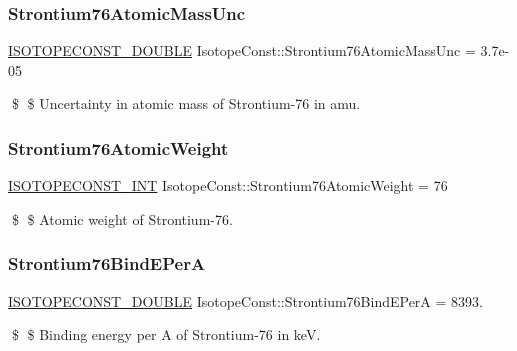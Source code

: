 \subsubsection{\texorpdfstring{Strontium76\+Atomic\+Mass\+Unc}{Strontium76AtomicMassUnc}}
{\footnotesize\ttfamily \mbox{\hyperlink{group___isotope_const-_macros_ga8f45a7272ce02c0b4c65c44636ed719a}{I\+S\+O\+T\+O\+P\+E\+C\+O\+N\+S\+T\+\_\+\+D\+O\+U\+B\+LE}} Isotope\+Const\+::\+Strontium76\+Atomic\+Mass\+Unc = 3.\+7e-\/05}

\$ \$ Uncertainty in atomic mass of Strontium-\/76 in amu. \mbox{\label{group___isotope_const-_strontium-_sr76_ga64325edd5c81eb6ec8439e5f89a200fe}} 
\subsubsection{\texorpdfstring{Strontium76\+Atomic\+Weight}{Strontium76AtomicWeight}}
{\footnotesize\ttfamily \mbox{\hyperlink{group___isotope_const-_macros_ga5f18360b3e99483a35c32d789e62621c}{I\+S\+O\+T\+O\+P\+E\+C\+O\+N\+S\+T\+\_\+\+I\+NT}} Isotope\+Const\+::\+Strontium76\+Atomic\+Weight = 76}

\$ \$ Atomic weight of Strontium-\/76. \mbox{\label{group___isotope_const-_strontium-_sr76_ga3fd026008b42d098c7028dc0bd17117d}} 
\subsubsection{\texorpdfstring{Strontium76\+Bind\+E\+PerA}{Strontium76BindEPerA}}
{\footnotesize\ttfamily \mbox{\hyperlink{group___isotope_const-_macros_ga8f45a7272ce02c0b4c65c44636ed719a}{I\+S\+O\+T\+O\+P\+E\+C\+O\+N\+S\+T\+\_\+\+D\+O\+U\+B\+LE}} Isotope\+Const\+::\+Strontium76\+Bind\+E\+PerA = 8393.}

\$ \$ Binding energy per A of Strontium-\/76 in keV. \mbox{\label{group___isotope_const-_strontium-_sr76_ga7e4ec5112468b72b5cb7cdde7d602de2}} 
